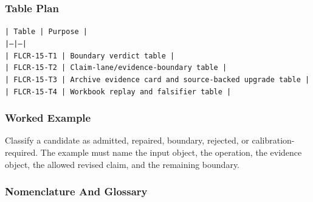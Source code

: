\documentclass[11pt]{article}
\begin{document}
\subsubsection*{Table Plan}

\noindent\texttt{| Table | Purpose |}\\
\noindent\texttt{|---|---|}\\
\noindent\texttt{| FLCR-15-T1 | Boundary verdict table |}\\
\noindent\texttt{| FLCR-15-T2 | Claim-lane/evidence-boundary table |}\\
\noindent\texttt{| FLCR-15-T3 | Archive evidence card and source-backed upgrade table |}\\
\noindent\texttt{| FLCR-15-T4 | Workbook replay and falsifier table |}\\

\subsubsection*{Worked Example}

Classify a candidate as admitted, repaired, boundary, rejected, or calibration-required. The example must name the input object, the operation,
the evidence object, the allowed revised claim, and the remaining boundary.

\subsubsection*{Nomenclature And Glossary}
\end{document}
